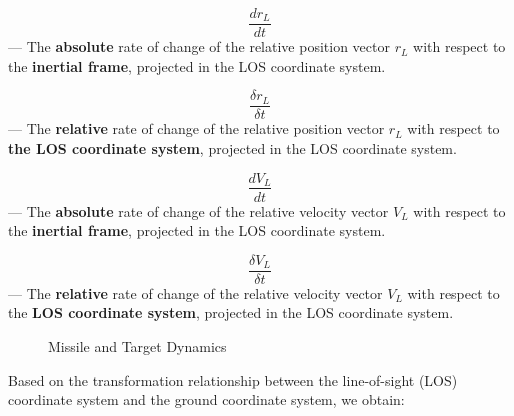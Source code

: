 \documentclass{article}
\begin{document}
\[
\frac{dr_L}{dt}
\]
— The \textbf{absolute} rate of change of the relative position vector \( r_L \) with respect to the \textbf{inertial frame}, projected in the LOS coordinate system.

\[
\frac{\delta r_L}{\delta t}
\]
— The \textbf{relative} rate of change of the relative position vector \( r_L \) with respect to \textbf{the LOS coordinate system}, projected in the LOS coordinate system.

\[
\frac{dV_L}{dt}
\]
— The \textbf{absolute} rate of change of the relative velocity vector \( V_L \) with respect to the \textbf{inertial frame}, projected in the LOS coordinate system.

\[
\frac{\delta V_L}{\delta t}
\]
— The \textbf{relative} rate of change of the relative velocity vector \( V_L \) with respect to the \textbf{LOS coordinate system}, projected in the LOS coordinate system.
 
\newpage
\begin{figure}[h]
  \centering
  \caption{Missile and Target Dynamics}
  \label{fig:annotated_image}
\end{figure}



Based on the transformation relationship between the line-of-sight (LOS) coordinate system and the ground coordinate system, we obtain:
\end{document}
